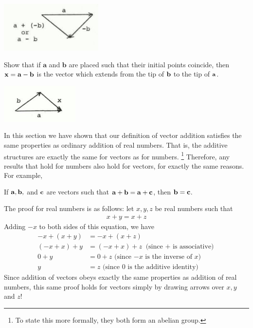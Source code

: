 \documentclass[12pt,letterpaper,reqno]{article}
\numberwithin{equation}{section}
\begin{document}
\begin{center}
	\includegraphics[scale=0.5]{figures_mvc/a_minus_b}
\end{center}

\begin{exercise}
Show that if $\mathbf{a}$ and $\mathbf{b}$ are placed such that their initial points coincide, then $\mathbf{x}={\bf a}-{\bf b}$ is the vector which extends from the tip of ${\bf b}$ to the tip of ${\bf a}$.
	\begin{center}
		\includegraphics[scale=0.5]{figures_mvc/b_plus_x_equals_a}
	\end{center}
\end{exercise}

In this section we have shown that our definition of vector addition satisfies the same properties as ordinary addition of real numbers. That is, the additive structures are exactly the same for vectors as for numbers. \footnote{To state this more formally, they both form an abelian group.} Therefore, any results that hold for numbers also hold for vectors, for exactly the same reasons. For example,

\begin{thm}
	If ${\bf a}, {\bf b},$ and ${\bf c}$ are vectors such that ${\bf a}+{\bf b}={\bf a}+{\bf c}$, then ${\bf b}={\bf c}$. 
\end{thm}

\begin{pf}
The proof for real numbers is as follows: let $x,y,z$ be real numbers such that 
\begin{align*}
	x+y=x+z
\end{align*}
Adding $-x$ to both sides of this equation, we have
\begin{align*}
	-x+(x+y)&=-x+(x+z) \\
	(-x+x)+y&=(-x+x)+z \text{ (since $+$ is associative)} \\
	0+y&=0+z \text{ (since $-x$ is the inverse of $x$)} \\
	y&=z \text{ (since $0$ is the additive identity)}
\end{align*}
Since addition of vectors obeys exactly the same properties as addition of real numbers, this same proof holds for vectors simply by drawing arrows over $x,y$ and $z$!
\end{pf}
\end{document}
